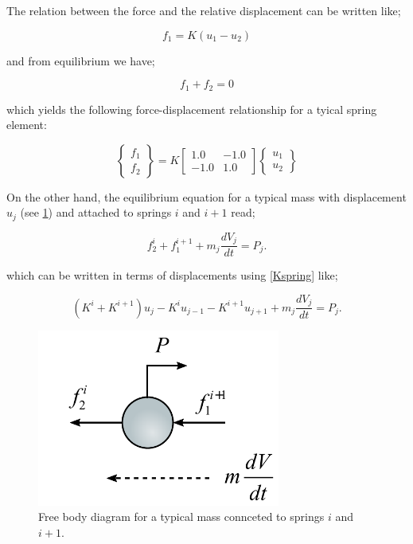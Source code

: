The relation between the force and the relative displacement can be written like;

\[{f_1} = K({u_1} - {u_2})\]

and from equilibrium we have;

\[{f_1} + {f_2} = 0\]

which yields the following force-displacement relationship for a tyical spring element:

\begin{equation}
\left\{ {\begin{array}{*{20}{c}}
{{f_1}}\\
{{f_2}}
\end{array}} \right\} = K\left[ {\begin{array}{*{20}{c}}
{1.0}&{ - 1.0}\\
{ - 1.0}&{1.0}
\end{array}} \right]\left\{ {\begin{array}{*{20}{c}}
{{u_1}}\\
{{u_2}}
\end{array}} \right\}
\label{Kspring}
\end{equation}

On the other hand, the equilibrium equation for a typical mass with displacement $u_j$  (see \cref{fig:dclmass}) and attached to springs $i$ and $i+1$ read;

\begin{equation}
f_2^i + f_1^{i + 1} + {m_j}\frac{{d{V_j}}}{{dt}} = {P_j}.
\label{equilmass}
\end{equation}

which can be written in terms of displacements using \cref{Kspring} like;

\[({K^i} + {K^{i + 1}}){u_j} - {K^i}{u_{j - 1}} - {K^{i + 1}}{u_{j + 1}} + {m_j}\frac{{d{V_j}}}{{dt}} = {P_j}.\]


\begin{figure}[H]
\centering
\includegraphics[width=8cm]{img/dcl_mass.pdf}
\caption{Free body diagram for a typical mass connceted to springs $i$ and $i+1$.}
\label{fig:dclmass}
\end{figure}

